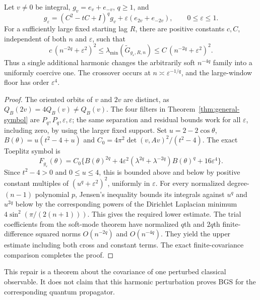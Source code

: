 \begin{corollary}
\label{cor:one-harmonic-repair}
Let $v\ne0$ be integral, $g_v=e_v+e_{-v}$, $q\ge1$, and
\[
 g_\varepsilon=(C^2-tC+I)^qg_v+\varepsilon(e_{2v}+e_{-2v}),
 \qquad 0\le\varepsilon\le1.
\]
For a sufficiently large fixed starting lag $R$, there are positive constants
$c,C$, independent of both $n$ and $\varepsilon$, such that
\[
 c\,(n^{-2q}+\varepsilon^2)^2
 \le\lambda_{\min}(\widetilde G_{g_\varepsilon,R,n})
 \le C\,(n^{-2q}+\varepsilon^2)^2.
\]
Thus a single additional harmonic changes the arbitrarily soft $n^{-4q}$
family into a uniformly coercive one. The crossover occurs at
$n\asymp\varepsilon^{-1/q}$, and the large-window floor has order
$\varepsilon^4$.
\end{corollary}
\begin{proof}
The oriented orbits of $v$ and $2v$ are distinct, as
$Q_B(2v)=4Q_B(v)\ne Q_B(v)$. The four filters in
Theorem~\ref{thm:general-symbol} are $P_q,P_q,\varepsilon,\varepsilon$;
the same separation and residual bounds work for all $\varepsilon$, including
zero, by using the larger fixed support. Set $u=2-2\cos\theta$,
$B(\theta)=u(t^2-4+u)$ and
$C_0=4\pi^2\det(v,Av)^2/(t^2-4)$. The exact Toeplitz symbol is
\[
 F_{g_\varepsilon}(\theta)
 =C_0\{B(\theta)^{2q}
       +4\varepsilon^2(\lambda^{2q}+\lambda^{-2q})B(\theta)^q
       +16\varepsilon^4\}.
\]
Since $t^2-4>0$ and $0\le u\le4$, this is bounded above and below by
positive constant multiples of $(u^q+\varepsilon^2)^2$, uniformly in
$\varepsilon$. For every normalized degree-$(n-1)$ polynomial $p$, Jensen's
inequality bounds its integrals against $u^q$ and $u^{2q}$ below by the
corresponding powers of the Dirichlet Laplacian minimum
$4\sin^2(\pi/(2(n+1)))$. This gives the required lower estimate.
The trial coefficients from the soft-mode theorem have normalized $q$th and
$2q$th finite-difference squared norms $O(n^{-2q})$ and $O(n^{-4q})$.
They yield the upper estimate including both cross and constant terms.
The exact finite-covariance comparison completes the proof.
\end{proof}
This repair is a theorem about the covariance of one perturbed classical
observable. It does not claim that this harmonic perturbation proves BGS for
the corresponding quantum propagator.

